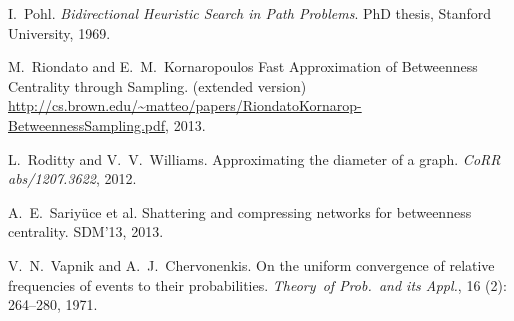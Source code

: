 \begin{thebibliography}{35}
I.~Pohl.
\newblock \emph{Bidirectional Heuristic Search in Path Problems}.
\newblock PhD thesis, Stanford University, 1969.

 M.~Riondato and E.~M.~Kornaropoulos
 \newblock Fast Approximation of Betweenness Centrality through Sampling.
 \newblock (extended version) \url{http://cs.brown.edu/~matteo/papers/RiondatoKornarop-BetweennessSampling.pdf}, 2013.

L.~Roditty and V.~V.~Williams.
\newblock Approximating the diameter of a graph.
\newblock \emph{CoRR abs/1207.3622}, 2012.

A.~E.~Sariy\"{u}ce et al.
\newblock Shattering and compressing networks for betweenness centrality.
\newblock SDM'13, 2013.

V.~N.~Vapnik and A.~J.~Chervonenkis.
\newblock On the uniform convergence of relative frequencies of events to their
  probabilities.
\newblock \emph{Theory~of Prob.~and its Appl.}, 16
  (2): 264--280, 1971.

\end{thebibliography}

